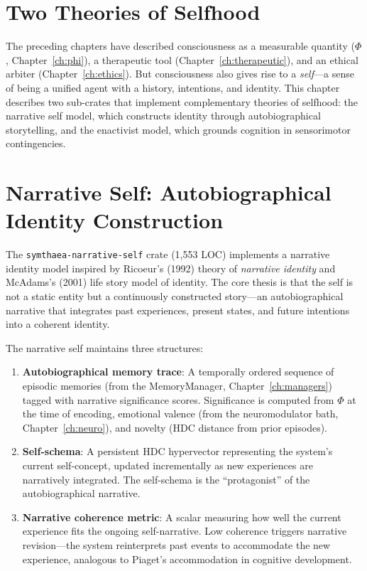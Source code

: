\documentclass[12pt]{book}
\begin{document}
\section{Two Theories of Selfhood}

The preceding chapters have described consciousness as a measurable quantity ($\Phi$, Chapter~\ref{ch:phi}), a therapeutic tool (Chapter~\ref{ch:therapeutic}), and an ethical arbiter (Chapter~\ref{ch:ethics}). But consciousness also gives rise to a \textit{self}---a sense of being a unified agent with a history, intentions, and identity. This chapter describes two sub-crates that implement complementary theories of selfhood: the narrative self model, which constructs identity through autobiographical storytelling, and the enactivist model, which grounds cognition in sensorimotor contingencies.

\section{Narrative Self: Autobiographical Identity Construction}

The \texttt{symthaea-narrative-self} crate (1,553 LOC) implements a narrative identity model inspired by Ricoeur's (1992) theory of \textit{narrative identity} and McAdams's (2001) life story model of identity. The core thesis is that the self is not a static entity but a continuously constructed story---an autobiographical narrative that integrates past experiences, present states, and future intentions into a coherent identity.

The narrative self maintains three structures:

\begin{enumerate}
  \item \textbf{Autobiographical memory trace}: A temporally ordered sequence of episodic memories (from the MemoryManager, Chapter~\ref{ch:managers}) tagged with narrative significance scores. Significance is computed from $\Phi$ at the time of encoding, emotional valence (from the neuromodulator bath, Chapter~\ref{ch:neuro}), and novelty (HDC distance from prior episodes).
  \item \textbf{Self-schema}: A persistent HDC hypervector representing the system's current self-concept, updated incrementally as new experiences are narratively integrated. The self-schema is the ``protagonist'' of the autobiographical narrative.
  \item \textbf{Narrative coherence metric}: A scalar measuring how well the current experience fits the ongoing self-narrative. Low coherence triggers narrative revision---the system reinterprets past events to accommodate the new experience, analogous to Piaget's accommodation in cognitive development.
\end{enumerate}
\end{document}
